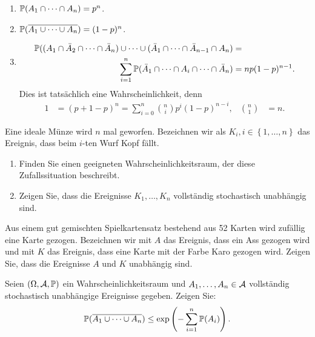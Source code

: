 \solution
\begin{enumerate}
    \item $\mathbb P(A_1 \cap \dots \cap A_n) = p^n$.
    \item $\mathbb P(\overline{A_1 \cup \dots \cup A_n}) = (1-p)^n$.
    \item \begin{align*}
            \mathbb P( (A_1 \cap \bar A_2 \cap \dots \cap \bar A_n)  \cup\dots\cup (\bar A_1 \cap \dots \cap \bar A_{n-1} \cap A_n) &= \\
            \sum_{i=1}^{n} \mathbb P(\bar A_1 \cap \dots \cap A_i \cap \dots \cap \bar A_n) &= n p (1-p)^{n-1}. 
        \end{align*}
        Dies ist tatsächlich eine Wahrscheinlichkeit, denn
        \begin{align*}
            1 &= (p + 1-p)^{n} = \sum_{i=0}^{n} \binom{n}{i} p^{i}(1-p)^{n-i}, &
            \binom{n}{1} &= n.
        \end{align*}
\end{enumerate}



 Eine ideale Münze wird $n$ mal geworfen.
Bezeichnen wir als $K_i, i\in \left\{1,\dots,n\right\}$ das Ereignis, dass
beim $i$-ten Wurf Kopf fällt. 
\begin{enumerate}
    \item Finden Sie einen geeigneten Wahrscheinlichkeitsraum, der diese
        Zufallssituation beschreibt.
    \item Zeigen Sie, dass die Ereignisse $K_1,\dots, K_n$ vollständig 
        stochastisch unabhängig sind.
\end{enumerate}


 Aus einem gut gemischten Spielkartensatz
bestehend aus 52 Karten wird zufällig eine Karte gezogen. Bezeichnen wir mit
$A$ das Ereignis, dass ein Ass gezogen wird und mit $K$ das Ereignis, dass eine
Karte mit der Farbe Karo gezogen wird. Zeigen Sie, dass die Ereignisse $A$ und
$K$ unabhängig sind. 


 Seien
$(\Omega, \mathcal A, \mathbb P)$ ein Wahrscheinlichkeitsraum und $A_1, \dots, A_n \in\mathcal A$
vollständig stochastisch unabhängige Ereignisse  gegeben. Zeigen Sie:
\begin{equation*}
    \mathbb P( \overline{A_1 \cup \dots \cup A_n} ) \leq \exp \left( - \sum_{i=1}^{n} \mathbb P(A_i) \right).
\end{equation*}

